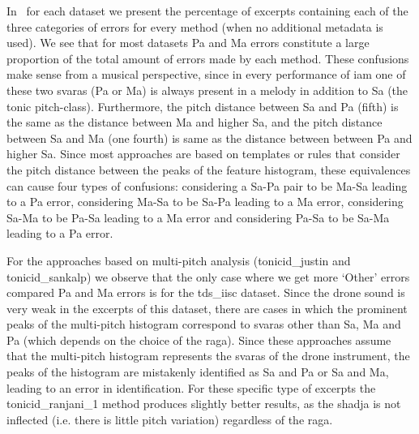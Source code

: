 {In~ for each dataset we present the percentage of excerpts containing each of the three categories of errors for every method (when no additional metadata is used). We see that for most datasets Pa and Ma errors constitute a large proportion of the total amount of errors made by each method. These confusions make sense from a musical perspective, since in every performance of \gls{iam} one of these two \glspl{svara} (Pa or Ma) is always present in a melody in addition to Sa (the tonic pitch-class). Furthermore, the pitch distance between Sa and Pa (fifth) is
the same as the distance between Ma and higher Sa, and the pitch distance between Sa and Ma (one fourth) is same as the distance between between Pa and higher Sa. Since most approaches are based on templates or rules that consider the pitch distance between the peaks of the feature histogram, these equivalences can
cause four types of confusions: considering a Sa-Pa pair to be Ma-Sa leading to a Pa error, considering Ma-Sa to be Sa-Pa leading to a Ma error, considering
Sa-Ma to be Pa-Sa leading to a Ma error and considering Pa-Sa to be Sa-Ma leading to a Pa error.

For the approaches based on multi-pitch analysis (\acrshort{tonicid_justin} and \acrshort{tonicid_sankalp}) we observe that the only case where we get more `Other' errors compared Pa and Ma errors is for the \acrshort{tds_iisc} dataset. Since the drone sound is very weak in the excerpts of this dataset, there are cases in which the prominent peaks of the multi-pitch histogram correspond to \glspl{svara} other than Sa, Ma and Pa (which depends on the choice of the \gls{raga}). Since these approaches assume that the multi-pitch histogram represents the \glspl{svara} of the drone instrument, the peaks of the histogram are mistakenly identified as Sa and Pa or Sa and Ma, leading to an error in identification. For these specific type of excerpts the \acrshort{tonicid_ranjani_1} method produces slightly better results, as the \gls{shadja} is not inflected (i.e. there is little pitch variation) regardless of the \gls{raga}.

}
